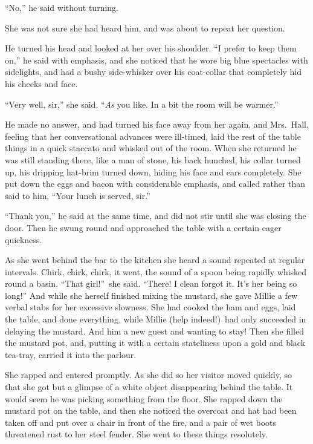 “No,” he said without turning.

She was not sure she had heard him, and was about to repeat her question.

He turned his head and looked at her over his shoulder. “I prefer to keep them on,” he said with emphasis, and she noticed that he wore big blue spectacles with sidelights, and had a bushy side-whisker over his coat-collar that completely hid his cheeks and face.

“Very well, sir,” she said. “\kern-3pt\emph{As} you like. In a bit the room will be warmer.”

He made no answer, and had turned his face away from her again, and Mrs.\ Hall, feeling that her conversational advances were ill-timed, laid the rest of the table things in a quick staccato and whisked out of the room. When she returned he was still standing there, like a man of stone, his back hunched, his collar turned up, his dripping hat-brim turned down, hiding his face and ears completely. She put down the eggs and bacon with considerable emphasis, and called rather than said to him, “Your lunch is served, sir.”

“Thank you,” he said at the same time, and did not stir until she was closing the door. Then he swung round and approached the table with a certain eager quickness.

As she went behind the bar to the kitchen she heard a sound repeated at regular intervals. Chirk, chirk, chirk, it went, the sound of a spoon being rapidly whisked round a basin. “That girl!”\ she said. “There! I clean forgot it. It’s her being so long!” And while she herself finished mixing the mustard, she gave Millie a few verbal stabs for her excessive slowness. She had cooked the ham and eggs, laid the table, and done everything, while Millie (help indeed!)\ had only succeeded in delaying the mustard. And him a new guest and wanting to stay! Then she filled the mustard pot, and, putting it with a certain stateliness upon a gold and black tea-tray, carried it into the parlour.

She rapped and entered promptly. As she did so her visitor moved quickly, so that she got but a glimpse of a white object disappearing behind the table. It would seem he was picking something from the floor. She rapped down the mustard pot on the table, and then she noticed the overcoat and hat had been taken off and put over a chair in front of the fire, and a pair of wet boots threatened rust to her steel fender. She went to these things resolutely.

